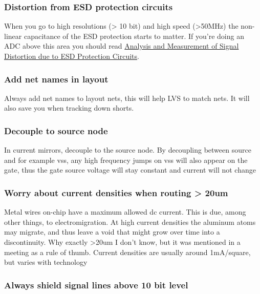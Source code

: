 \subsubsection{Distortion from ESD protection
circuits}\label{distortion-from-esd-protection-circuits}

When you go to high resolutions (\textgreater{} 10 bit) and high speed
(\textgreater50MHz) the non-linear capacitance of the ESD protection
starts to matter. If you're doing an ADC above this area you should read
\href{https://ieeexplore.ieee.org/document/1703690}{Analysis and
Measurement of Signal Distortion due to ESD Protection Circuits}.

\subsubsection{Add net names in layout}\label{add-net-names-in-layout}

Always add net names to layout nets, this will help LVS to match nets.
It will also save you when tracking down shorts.

\subsubsection{Decouple to source node}\label{decouple-to-source-node}

In current mirrors, decouple to the source node. By decoupling between
source and for example vss, any high frequency jumps on vss will also
appear on the gate, thus the gate source voltage will stay constant and
current will not change

\subsubsection{Worry about current densities when routing \textgreater{}
20um}\label{worry-about-current-densities-when-routing-20um}

Metal wires on-chip have a maximum allowed dc current. This is due,
among other things, to electromigration. At high current densities the
aluminum atoms may migrate, and thus leave a void that might grow over
time into a discontinuity. Why exactly \textgreater20um I don't know,
but it was mentioned in a meeting as a rule of thumb. Current densities
are usually around 1mA/square, but varies with technology

\subsubsection{Always shield signal lines above 10 bit
level}\label{always-shield-signal-lines-above-10-bit-level}

